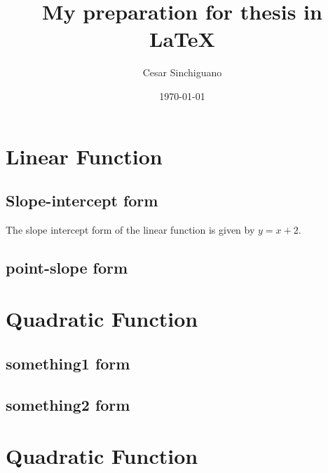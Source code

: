\documentclass[11]{article}
\begin{document}
\tableofcontents


\title{My preparation for thesis in \LaTeX}
\author{Cesar Sinchiguano}
\date{\today}
\maketitle



\section{Linear Function}
	\subsection{Slope-intercept form}
	The slope intercept form of the linear function is given by $y=x+2$.
	\subsection{point-slope form}
\section{Quadratic Function}
	\subsection{something1 form}
	\subsection{something2 form}
\section*{Quadratic Function}
\end{document}
